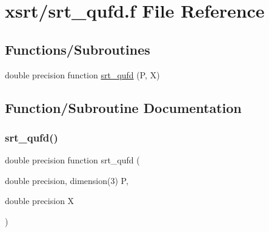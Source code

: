 \hypertarget{srt__qufd_8f}{}\section{xsrt/srt\+\_\+qufd.f File Reference}
\label{srt__qufd_8f}
\subsection*{Functions/\+Subroutines}
\begin{DoxyCompactItemize}
\item 
double precision function \hyperlink{srt__qufd_8f_a488d779a9dfd19f9402cd7da8b825050}{srt\+\_\+qufd} (P, X)
\end{DoxyCompactItemize}


\subsection{Function/\+Subroutine Documentation}
\mbox{\label{srt__qufd_8f_a488d779a9dfd19f9402cd7da8b825050}} 
\subsubsection{\texorpdfstring{srt\+\_\+qufd()}{srt\_qufd()}}
{\footnotesize\ttfamily double precision function srt\+\_\+qufd (\begin{DoxyParamCaption}\item[{double precision, dimension(3)}]{P,  }\item[{double precision}]{X }\end{DoxyParamCaption})}

